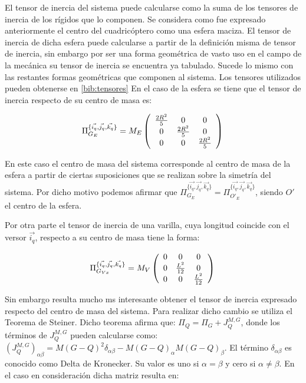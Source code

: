 \label{tensores}

El tensor de inercia del sistema puede calcularse como la suma de los tensores de inercia de los rígidos que lo componen. Se considera como fue expresado anteriormente el centro del cuadricóptero como una esfera maciza. El tensor de inercia de dicha esfera puede calcularse a partir de la definición misma de tensor de inercia, sin embargo por ser una forma geométrica de vasto uso en el campo de la mecánica su tensor de inercia se encuentra ya tabulado. Sucede lo mismo con las restantes formas geométricas que componen al sistema. Los tensores utilizados pueden obtenerse en \ref{bib:tensores} En el caso de la esfera se tiene que el tensor de inercia respecto de  su centro de masa es: 

$$
\Pi_{G_E}^{\{\vec{i_q}, \vec{j_q}, \vec{k_q}\}}= M_E\left(\begin{array}{ccc}
\frac{2R^2}{5}  &0&  0\\
0  &\frac{2R^2}{5} & 0\\
0  &0 & \frac{2R^2}{5} \\
\end{array}\right) \\
$$

En este caso el centro de masa del sistema corresponde al centro de masa de la esfera a partir de ciertas suposiciones que se realizan sobre la simetría del sistema. Por dicho motivo podemos afirmar que $\Pi_{G_E}^{\{\vec{i_q}, \vec{j_q}, \vec{k_q}\}} = \Pi_{O\prime _E}^{\{\vec{i_q}, \vec{j_q}, \vec{k_q}\}} $, siendo $O\prime$ el centro de la esfera.

Por otra parte el tensor de inercia de una varilla, cuya longitud coincide con el versor $\vec{i_q}$, respecto a su centro de masa tiene la forma:

$$
\Pi_{G_{Vx}}^{\{\vec{i_q}, \vec{j_q}, \vec{k_q}\}}= M_V\left(\begin{array}{ccc}
0  &0&  0\\
0  &\frac{L^2}{12} & 0\\
0  &0 & \frac{L^2}{12}  \\
\end{array}\right) \\ 
$$

Sin embargo resulta mucho ms interesante obtener el tensor de inercia expresado respecto del centro de masa del sistema. Para realizar dicho cambio se utiliza el Teorema de Steiner. Dicho teorema afirma que: $\Pi_Q = \Pi_G +J_Q^{M,G}$, donde los términos de $J_Q^{M,G}$ pueden calcularse como: $(J_Q^{M,G})_{\alpha \beta} = M(G-Q)^2\delta_{\alpha \beta}-M(G-Q)_{\alpha}M(G-Q)_{\beta}$. El término $\delta_{\alpha \beta}$ es conocido como Delta de Kronecker. Su valor es uno si $\alpha =\beta$ y cero si $\alpha \neq \beta$. En el caso en consideración dicha matriz resulta en:

